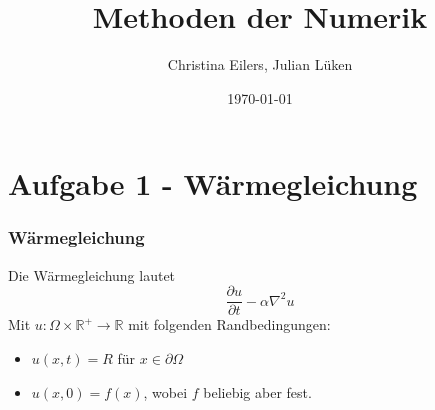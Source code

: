 \documentclass[xcolor = dvipsnames, notheorems]{beamer}
\title{Methoden der Numerik}
\date{\today}
\author{Christina Eilers, Julian Lüken}
\institute{Mathematisches Institut Göttingen}
\theoremstyle{definition}
\begin{document}
\begin{frame}
	\maketitle
\end{frame}

\section{Aufgabe 1 - Wärmegleichung}
\begin{frame}
\frametitle{Wärmegleichung}
	Die Wärmegleichung lautet
	$$ \frac{\partial u}{\partial t} - \alpha \nabla^2 u$$
	Mit $u: \Omega \times \mathbb{R}^+ \rightarrow \mathbb{R}$ mit folgenden Randbedingungen:
	\begin{itemize}
		\item $ u(x,t) = R$ für $ x \in \partial \Omega$	
		\item $ u(x,0) = f(x) $, wobei $f$ beliebig aber fest.
	\end{itemize}
\end{frame}
\end{document}
